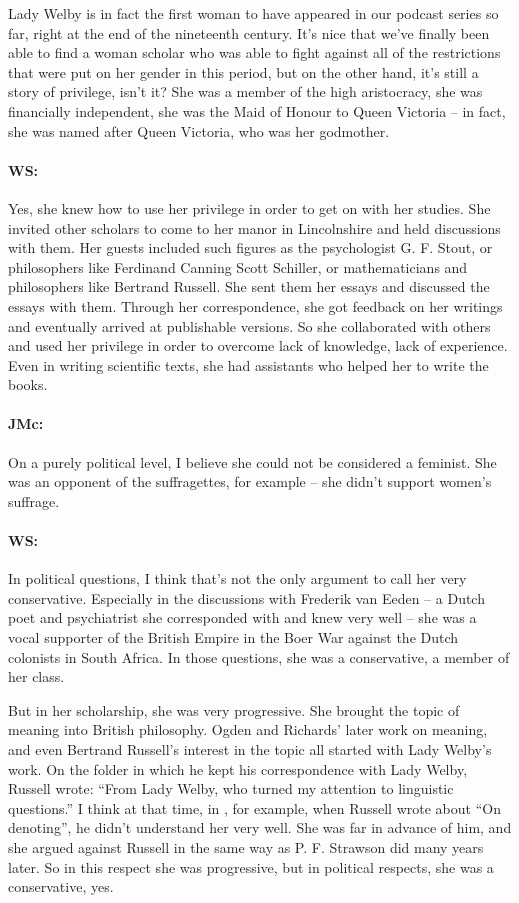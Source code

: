 \documentclass[output=paper]{langscibook}
\begin{document}
Lady Welby is in fact the first woman to have appeared in our podcast series so far, right at the end of the nineteenth century. It’s nice that we’ve finally been able to find a woman scholar who was able to fight against all of the restrictions that were put on her gender in this period, but on the other hand, it’s still a story of privilege, isn’t it? She was a member of the high aristocracy, she was financially independent, she was the Maid of Honour to Queen Victoria – in fact, she was named after Queen Victoria, who was her godmother.

\paragraph*{WS:} Yes, she knew how to use her privilege in order to get on with her studies. She invited other scholars to come to her manor in Lincolnshire and held discussions with them. Her guests included such figures as the psychologist G. F. Stout, or philosophers like Ferdinand Canning Scott Schiller, or mathematicians and philosophers like Bertrand Russell. She sent them her essays and discussed the essays with them. Through her correspondence, she got feedback on her writings and eventually arrived at publishable versions. So she collaborated with others and used her privilege in order to overcome lack of knowledge, lack of experience. Even in writing scientific texts, she had assistants who helped her to write the books.

\paragraph*{JMc:} On a purely political level, I believe she could not be considered a feminist. She was an opponent of the suffragettes, for example – she didn’t support women’s suffrage.

\paragraph*{WS:} In political questions, I think that’s not the only argument to call her very conservative. Especially in the discussions with Frederik van Eeden – a Dutch poet and psychiatrist she corresponded with and knew very well – she was a vocal supporter of the British Empire in the Boer War against the Dutch colonists in South Africa. In those questions, she was a conservative, a member of her class.

But in her scholarship, she was very progressive. She brought the topic of meaning into British philosophy. Ogden and Richards’ later work on meaning, and even Bertrand Russell’s interest in the topic all started with Lady Welby’s work. On the folder in which he kept his correspondence with Lady Welby, Russell wrote: ``From Lady Welby, who turned my attention to linguistic questions.'' I think at that time, in \citeyear{russell1905a}, for example, when Russell wrote about ``On denoting'', he didn’t understand her very well. She was far in advance of him, and she argued against Russell in the same way as P. F. Strawson did many years later. So in this respect she was progressive, but in political respects, she was a conservative, yes.
\end{document}
